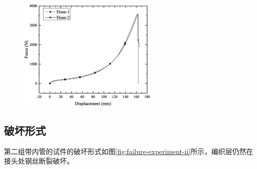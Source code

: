 \begin{figure}[!htb]
	\centering
	\includegraphics[width=0.6\textwidth]{figure/experiment/E2/Graph01}
	
	\label{fig:experiment-2}
\end{figure}


\subsection{破坏形式}



第二组带内管的试件的破坏形式如图\ref{fig:failure-experiment-ii}所示，编织层仍然在接头处钢丝断裂破坏。

